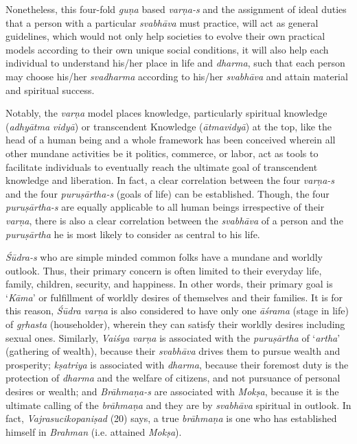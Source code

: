 Nonetheless, this four-fold \emph{guṇa} based \emph{varṇa-s} and the assignment of ideal duties that a person with a particular \emph{svabhāva} must practice, will act as general guidelines, which would not only help societies to evolve their own practical models according to their own unique social conditions, it will also help each individual to understand his/her place in life and \emph{dharma}, such that each person may choose his/her \emph{svadharma} according to his/her \emph{svabhāva} and attain material and spiritual success.
\eject

Notably, the \emph{varṇa} model places knowledge, particularly spiritual knowledge (\emph{adhyātma} \emph{vidyā}) or transcendent Knowledge (\emph{ātmavidyā}) at the top, like the head of a human being and a whole framework has been conceived wherein all other mundane activities be it politics, commerce, or labor, act as tools to facilitate individuals to eventually reach the ultimate goal of transcendent knowledge and liberation. In fact, a clear correlation between the four \emph{varṇa-s} and the four \emph{puruṣārtha-s} (goals of life) can be established. Though, the four \emph{puruṣārtha-s} are equally applicable to all human beings irrespective of their \emph{varṇa}, there is also a clear correlation between the \emph{svabhāva} of a person and the \emph{puruṣārtha} he is most likely to consider as central to his life.

\emph{Śūdra-s} who are simple minded common folks have a mundane and worldly outlook. Thus, their primary concern is often limited to their everyday life, family, children, security, and happiness. In other words, their primary goal is `\emph{Kāma}' or fulfillment of worldly desires of themselves and their families. It is for this reason, \emph{Śūdra} \emph{varṇa} is also considered to have only one \emph{āśrama} (stage in life) of \emph{gṛhasta} (householder), wherein they can satisfy their worldly desires including sexual ones. Similarly, \emph{Vaiśya} \emph{varṇa} is associated with the \emph{puruṣārtha} of `\emph{artha}' (gathering of wealth), because their \emph{svabhāva} drives them to pursue wealth and prosperity; \emph{kṣatriya} is associated with \emph{dharma}, because their foremost duty is the protection of \emph{dharma} and the welfare of citizens, and not pursuance of personal desires or wealth; and \emph{Brāhmaṇa-s} are associated with \emph{Mokṣa}, because it is the ultimate calling of the \emph{brāhmaṇa} and they are by \emph{svabhāva} spiritual in outlook. In fact, \emph{Vajrasucikopaniṣad} (20) says, a true \emph{brāhmaṇa} is one who has established himself in \emph{Brahman} (i.e. attained \emph{Mokṣa}).

